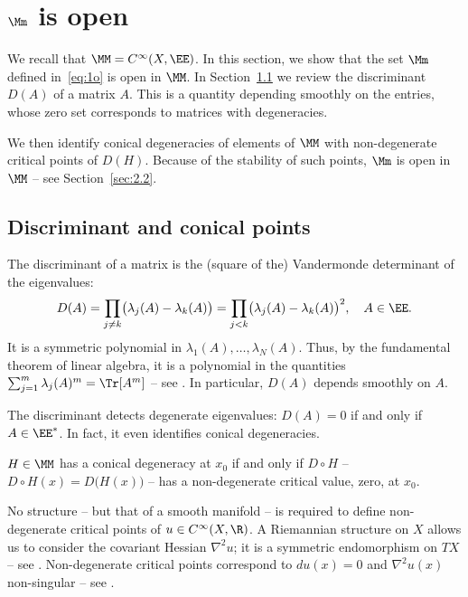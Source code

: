 \section{\texorpdfstring{$\Mm$}{M} is open}\label{sec:2}

We recall that $\MM = C^\infty(X,\EE)$. In this section, we show that the set $\Mm$ defined in~\eqref{eq:1o} is open in $\MM$. In Section~\ref{sec:2.1} we review the discriminant $D(A)$ of a matrix $A$. This is a quantity depending smoothly on the entries, whose zero set corresponds to matrices with degeneracies.

We then identify conical degeneracies of elements of $\MM$ with non-degenerate critical points of $D(H)$. Because of the stability of such points, $\Mm$ is open in $\MM$ -- see Section~\ref{sec:2.2}.

\subsection{Discriminant and conical points}\label{sec:2.1} The discriminant of a matrix is the (square of the) Vandermonde determinant of the eigenvalues:
\begin{equation}\label{eq:1h}
D(A) = \prod_{j \neq k} \bigl(\lambda_j(A)-\lambda_k(A)\bigr) = \prod_{j < k} \bigl(\lambda_j(A)-\lambda_k(A)\bigr)^2, \quad A\in \EE.
\end{equation}
It is a symmetric polynomial in $\lambda_1(A), \dots, \lambda_N(A)$. Thus, by the fundamental theorem of linear algebra, it is a polynomial in the quantities $\sum_{j=1}^m \lambda_j(A)^m = \Tr[A^m]$ -- see \eg \cite[\S I.2]{M95}. In particular, $D(A)$ depends smoothly on $A$.

The discriminant detects degenerate eigenvalues: $D(A) = 0$ if and only if $A \in \EE^*$. In fact, it even identifies conical degeneracies.

\begin{lem}\label{lem:1a} $H \in \MM$ has a conical degeneracy at $x_0$ if and only if $D \circ H$ -- \ie $D \circ H(x) = D\bigl( H(x) \bigr)$ -- has a non-degenerate critical value, zero, at $x_0$.
\end{lem}

\begin{rmk}\label{rem:2} No structure -- but that of a smooth manifold -- is required to define non-degenerate critical points of $u \in C^\infty(X,\R)$. A Riemannian structure on $X$ allows us to consider the covariant Hessian $\nabla^2 u$; it is a symmetric endomorphism on $TX$ -- see \eg \cite[\S2.1]{P06}. Non-degenerate critical points correspond to $du(x) = 0$ and $\nabla^2u(x)$ non-singular -- see \eg \cite[\S5.12]{P06}.
\end{rmk}

